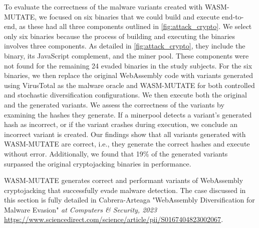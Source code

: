 \begin{strategy}
    \label{evasion_impact}
    To evaluate the correctness of the malware variants created with WASM-MUTATE, we focused on six binaries that we could build and execute end-to-end, as these had all three components outlined in \autoref{fig:attack_crypto}. 
    We select only six binaries because the process of building and executing the binaries involves three components. 
    As detailed in \autoref{fig:attack_crypto}, they include the \Was binary, its JavaScript complement, and the miner pool. 
    These components were not found for the remaining 24 evaded binaries in the study subjects.
    For the six binaries, we then replace the original WebAssembly code with variants generated using VirusTotal as the malware oracle and WASM-MUTATE for both controlled and stochastic diversification configurations. 
    We then execute both the original and the generated variants. 
    We assess the correctness of the variants by examining the hashes they generate.
    If a minerpool detects a variant's generated hash as incorrect, or if the variant crashes during execution, we conclude an incorrect variant is created.
    Our findings show that all variants generated with WASM-MUTATE are correct, i.e., they generate the correct hashes and execute without error.
    Additionally, we found that 19\% of the generated variants surpassed the original cryptojacking binaries in performance.
\end{strategy}

\begin{tcolorbox}[title=Contribution paper,boxrule=1pt,arc=.2em,boxsep=1.0mm]
    WASM-MUTATE generates correct and performant variants of WebAssembly cryptojacking that successfully evade malware detection.
    The case discussed in this section is fully detailed in Cabrera-Arteaga \etal "WebAssembly Diversification for Malware Evasion"
    \emph{at Computers \& Security, 2023}
    \url{https://www.sciencedirect.com/science/article/pii/S0167404823002067}. 
\end{tcolorbox}



